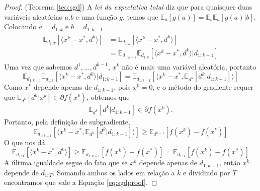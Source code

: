\documentclass[
	12pt,				%
    oneside,			%
	a4paper,			%
	english,			%
	french,				%
	spanish,			%
	brazil,				%
	]{abntex2}
\begin{document}
\begin{proof}{(Teorema \ref{teo:sgd})}
                A \emph{lei da expectativa total} diz que para quaisquer duas variáveis aleatórias \emph{a,b} e uma função $g$, temos que $\mathbb{E}_{a}[g(a)] = \mathbb{E}_b\mathbb{E}_a[g(a)\vert b]$. Colocando $a = d_{1:k}$ e $b = d_{1:k-1}$
                \begin{align*}
                    \begin{split}
                       \mathbb{E}_{d_{1:T}}[\langle x^k - x^{*}, d^k \rangle] &= \mathbb{E}_{d_{1:k}}[\langle x^k - x^{*}, d^k \rangle] \\
                       &= \mathbb{E}_{d_{1:k-1}}\mathbb{E}_{d_{1:k}}[\langle x^k- x^{*}, d^k \rangle \vert d_{1:k-1}]
                    \end{split}
                \end{align*}
                Uma vez que sabemos $d^1,...,d^{k-1}$, $x^k$ não é mais uma variável aleatória, portanto
                \begin{equation*}
                   \mathbb{E}_{d_{1:k-1}}\mathbb{E}_{d_{1:k}}[\langle x^k - x^{*}, d^k \rangle \vert d_{1:k-1}] = \mathbb{E}_{d_{1:k-1}}[\langle x^k - x^{*}, \mathbb{E}_{d^{k}}[d^k \vert d_{1:k-1}] \rangle]
                \end{equation*}
                Como $x^k$ depende apenas de $d_{1:k-1}$, pois $x^0=0$, e o método do gradiente requer que $\mathbb{E}_{d^k}[d^k \vert x^k] \in \partial f(x^k)$, obtemos que
                \begin{gather*}
                    \mathbb{E}_{d^k}[d^k \vert d_{1:k-1}] \in \partial f(x^k).
                \end{gather*}
                Portanto, pela definição de subgradiente,
                \begin{equation*}
                    \mathbb{E}_{d_{1:k-1}}[\langle x^k - x^{*}, \mathbb{E}_{d^{k}}[d^k \vert d_{1:k-1}] \rangle] \geq \mathbb{E}_{d^{k-1}}[f(x^k) - f(x^{*})]
                \end{equation*}
                O que nos dá
                \begin{equation*}
                    \mathbb{E}_{d_{1:T}}[\langle x^k - x^{*}, d^k \rangle] \geq \mathbb{E}_{d_{1:k-1}}[f(x^k) - f(x^{*})] = \mathbb{E}_{d_{1:T}}[f(x^k) - f(x^{*})]
                \end{equation*}
                A última igualdade segue do fato que se $x^k$ depende apenas de $d_{1:k-1}$, então $x^k$ depende de $d_{1:T}$. Somando ambos os lados em relação a $k$ e dividindo por $T$ encontramos que vale a Equação \eqref{eq:sgdproof}.
            \end{proof}
\end{document}
